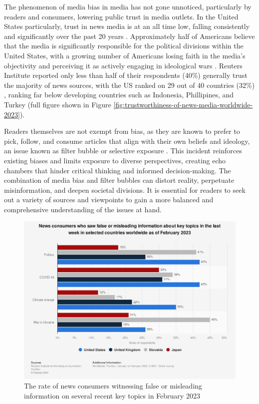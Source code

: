 The phenomenon of media bias in media has not gone unnoticed, particularly by readers and consumers, lowering public trust in media outlets. In the United States particularly, trust in news media is at an all time low, falling consistently and significantly over the past 20 years \cite{pew-2021-partisan-divides, gallup-knight-2020-american-views, reuters-2023-digital-news-report}. Approximately half of Americans believe that the media is significantly responsible for the political divisions within the United States, with a growing number of Americans losing faith in the media's objectivity and perceiving it as actively engaging in ideological wars \cite{gallup-knight-2020-american-views}. Reuters Institute reported only less than half of their respondents (40\%) generally trust the majority of news sources, with the US ranked on 29 out of 40 countries (32\%) \cite{reuters-2023-digital-news-report,reuters-2023-trust}, ranking far below developing countries such as Indonesia, Phillipines, and Turkey (full figure shown in Figure \ref{fig:trustworthiness-of-news-media-worldwide-2023}).

Readers themselves are not exempt from bias, as they are known to prefer to pick, follow, and consume articles that align with their own beliefs and ideology, an issue known as filter bubble \cite{lim-2018-understanding} or selective exposure \cite{spinde-2024-taxonomy}. This incident reinforces existing biases and limits exposure to diverse perspectives, creating echo chambers that hinder critical thinking and informed decision-making. The combination of media bias and filter bubbles can distort reality, perpetuate misinformation, and deepen societal divisions. It is essential for readers to seek out a variety of sources and viewpoints to gain a more balanced and comprehensive understanding of the issues at hand.


\begin{figure}[htbp]
    \centering
    \includegraphics[width=0.9\linewidth]{images/statistic_id1317019_consumers-witnessing-false-information-on-certain-topics-worldwide-2023.png}
    \caption{The rate of news consumers witnessing false or misleading information on several recent key topics in February 2023 \cite{reuters-2023-false-info}}
    \label{fig:consumers-witnessing-false-information-on-certain-topics-worldwide-2023}
\end{figure}


